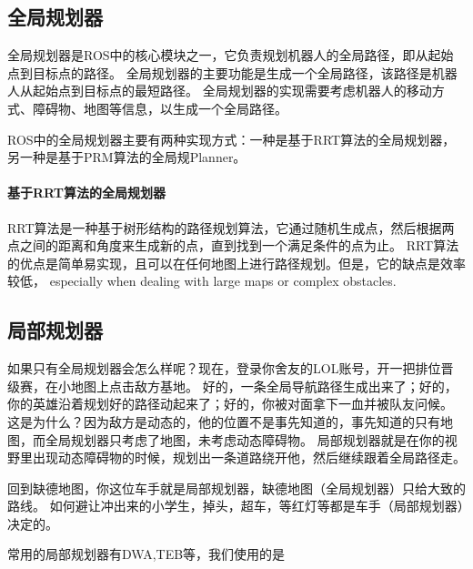 \subsection{全局规划器}

全局规划器是ROS中的核心模块之一，它负责规划机器人的全局路径，即从起始点到目标点的路径。
全局规划器的主要功能是生成一个全局路径，该路径是机器人从起始点到目标点的最短路径。
全局规划器的实现需要考虑机器人的移动方式、障碍物、地图等信息，以生成一个全局路径。

ROS中的全局规划器主要有两种实现方式：一种是基于RRT算法的全局规划器，另一种是基于PRM算法的全局规Planner。

\paragraph{基于RRT算法的全局规划器}

RRT算法是一种基于树形结构的路径规划算法，它通过随机生成点，然后根据两点之间的距离和角度来生成新的点，直到找到一个满足条件的点为止。
RRT算法的优点是简单易实现，且可以在任何地图上进行路径规划。但是，它的缺点是效率较低，
 especially when dealing with large maps or complex obstacles.

\subsection{局部规划器}
如果只有全局规划器会怎么样呢？现在，登录你舍友的LOL账号，开一把排位晋级赛，在小地图上点击敌方基地。
好的，一条全局导航路径生成出来了；好的，你的英雄沿着规划好的路径动起来了；好的，你被对面拿下一血并被队友问候。
这是为什么？因为敌方是动态的，他的位置不是事先知道的，事先知道的只有地图，而全局规划器只考虑了地图，未考虑动态障碍物。
局部规划器就是在你的视野里出现动态障碍物的时候，规划出一条道路绕开他，然后继续跟着全局路径走。

回到缺德地图，你这位车手就是局部规划器，缺德地图（全局规划器）只给大致的路线。
如何避让冲出来的小学生，掉头，超车，等红灯等都是车手（局部规划器）决定的。

常用的局部规划器有DWA,TEB等，我们使用的是